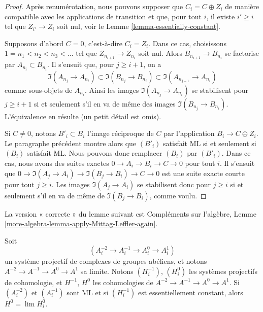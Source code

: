 \begin{proof}
Après renumérotation, nous pouvons supposer que $C_i = C \oplus Z_i$
de manière compatible avec les applications de transition et que, pour tout
$i$, il existe $i' \geq i$ tel que $Z_{i'} \to Z_i$ soit nul, voir le
Lemme \ref{lemma-essentially-constant}.

\medskip\noindent
Supposons d'abord $C = 0$, c'est-à-dire $C_i = Z_i$.
Dans ce cas, choisissons $1 = n_1 < n_2 < n_3 < \ldots$
tel que $Z_{n_{i + 1}} \to Z_{n_i}$ soit nul.
Alors $B_{n_{i + 1}} \to B_{n_i}$ se factorise par
$A_{n_i} \subset B_{n_i}$.
Il s'ensuit que, pour $j \geq i + 1$, on a
$$
\Im(A_{n_j} \to A_{n_i}) \subset \Im(B_{n_j} \to B_{n_i}) \subset
\Im(A_{n_{j - 1}} \to A_{n_i})
$$
comme sous-objets de $A_{n_i}$.
Ainsi les images $\Im(A_{n_j} \to A_{n_i})$ se stabilisent pour
$j \geq i + 1$ si et seulement s'il en va de même des images
$\Im(B_{n_j} \to B_{n_i})$.
L'équivalence en résulte (un petit détail est omis).

\medskip\noindent
Si $C \not = 0$, notons $B'_i \subset B_i$ l'image réciproque
de $C$ par l'application $B_i \to C \oplus Z_i$. Le paragraphe précédent
montre alors que $(B'_i)$ satisfait ML si et seulement si $(B_i)$
satisfait ML. Nous pouvons donc remplacer $(B_i)$ par $(B'_i)$.
Dans ce cas, nous avons des suites exactes
$0 \to A_i \to B_i \to C \to 0$
pour tout $i$. Il s'ensuit que
$0 \to \Im(A_j \to A_i) \to \Im(B_j \to B_i) \to C \to 0$
est une suite exacte courte pour tout $j \geq i$. Les images
$\Im(A_j \to A_i)$ se stabilisent donc pour $j \geq i$
si et seulement s'il en va de même de $\Im(B_j \to B_i)$,
comme voulu.
\end{proof}

\noindent
La version « correcte » du lemme suivant est
Compléments sur l'algèbre, Lemme
\ref{more-algebra-lemma-apply-Mittag-Leffler-again}.

\begin{lemma}
\label{lemma-apply-Mittag-Leffler-again}
Soit
$$
(A^{-2}_i \to A^{-1}_i \to A^0_i \to A^1_i)
$$
un système projectif de complexes de groupes abéliens, et notons
$A^{-2} \to A^{-1} \to A^0 \to A^1$ sa limite. Notons
$(H_i^{-1})$, $(H_i^0)$ les systèmes projectifs de cohomologie, et
$H^{-1}$, $H^0$ les cohomologies de
$A^{-2} \to A^{-1} \to A^0 \to A^1$.
Si $(A^{-2}_i)$ et $(A^{-1}_i)$ sont ML et si
$(H^{-1}_i)$ est essentiellement constant, alors
$H^0 = \lim H_i^0$.
\end{lemma}

